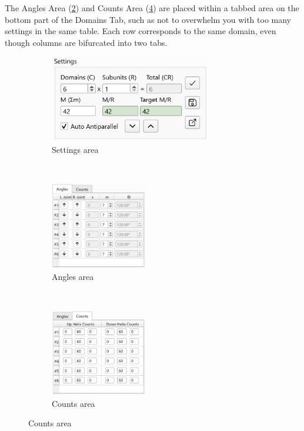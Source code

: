 \documentclass[titlepage]{article}
\begin{document}
The Angles Area (\ref{fig:domains-tab-table-angles}) and Counts Area (\ref{fig:domains-tab-table-counts}) are placed within a tabbed area on the bottom part of the Domains Tab, such as not to overwhelm you with too many settings in the same table. Each row corresponds to the same domain, even though columns are bifurcated into two tabs.

\begin{figure} \label{fig:domains-tab-components}
	\caption{Domains Subpanel Components}
	\centering
	\begin{subfigure}{.45\linewidth} \label{fig:domains-tab-settings-area}
		\centering
		\includegraphics[height=1.5in]{domains-tab-settings-area.png}
		\caption{Settings area}
	\end{subfigure}%
	~
	\begin{subfigure}{.3\linewidth} \label{fig:domains-tab-table-angles}
		\centering
		\includegraphics[height=1.5in]{domains-tab-table-angles.png}
		\caption{Angles area}
	\end{subfigure}%
	~
	\begin{subfigure}{.3\linewidth} \label{fig:domains-tab-table-counts}
		\centering
		\includegraphics[height=1.5in]{domains-tab-table-counts.png}
		\caption{Counts area}
	\end{subfigure}
\end{figure}
\end{document}
